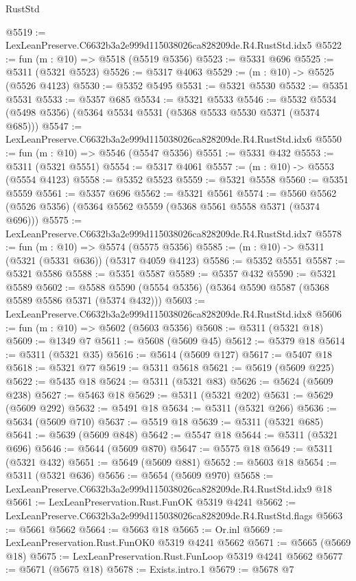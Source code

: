 \begin{lexlean}{RustStd}
\begin{coremodule}
@5519 := LexLeanPreserve.C6632b3a2e999d115038026ca828209de.R4.RustStd.idx5
@5522 := fun (m : @10) => @5518 (@5519 @5356)
@5523 := @5331 @696
@5525 := @5311 (@5321 @5523)
@5526 := @5317 @4063
@5529 := (m : @10) -> @5525 (@5526 @4123)
@5530 := @5352 @5495
@5531 := @5321 @5530
@5532 := @5351 @5531
@5533 := @5357 @685
@5534 := @5321 @5533
@5546 := @5532 @5534 (@5498 @5356) (@5364 @5534 @5531 (@5368 @5533 @5530 @5371 (@5374 @685)))
@5547 := LexLeanPreserve.C6632b3a2e999d115038026ca828209de.R4.RustStd.idx6
@5550 := fun (m : @10) => @5546 (@5547 @5356)
@5551 := @5331 @432
@5553 := @5311 (@5321 @5551)
@5554 := @5317 @4061
@5557 := (m : @10) -> @5553 (@5554 @4123)
@5558 := @5352 @5523
@5559 := @5321 @5558
@5560 := @5351 @5559
@5561 := @5357 @696
@5562 := @5321 @5561
@5574 := @5560 @5562 (@5526 @5356) (@5364 @5562 @5559 (@5368 @5561 @5558 @5371 (@5374 @696)))
@5575 := LexLeanPreserve.C6632b3a2e999d115038026ca828209de.R4.RustStd.idx7
@5578 := fun (m : @10) => @5574 (@5575 @5356)
@5585 := (m : @10) -> @5311 (@5321 (@5331 @636)) (@5317 @4059 @4123)
@5586 := @5352 @5551
@5587 := @5321 @5586
@5588 := @5351 @5587
@5589 := @5357 @432
@5590 := @5321 @5589
@5602 := @5588 @5590 (@5554 @5356) (@5364 @5590 @5587 (@5368 @5589 @5586 @5371 (@5374 @432)))
@5603 := LexLeanPreserve.C6632b3a2e999d115038026ca828209de.R4.RustStd.idx8
@5606 := fun (m : @10) => @5602 (@5603 @5356)
@5608 := @5311 (@5321 @18)
@5609 := @1349 @7
@5611 := @5608 (@5609 @45)
@5612 := @5379 @18
@5614 := @5311 (@5321 @35)
@5616 := @5614 (@5609 @127)
@5617 := @5407 @18
@5618 := @5321 @77
@5619 := @5311 @5618
@5621 := @5619 (@5609 @225)
@5622 := @5435 @18
@5624 := @5311 (@5321 @83)
@5626 := @5624 (@5609 @238)
@5627 := @5463 @18
@5629 := @5311 (@5321 @202)
@5631 := @5629 (@5609 @292)
@5632 := @5491 @18
@5634 := @5311 (@5321 @266)
@5636 := @5634 (@5609 @710)
@5637 := @5519 @18
@5639 := @5311 (@5321 @685)
@5641 := @5639 (@5609 @848)
@5642 := @5547 @18
@5644 := @5311 (@5321 @696)
@5646 := @5644 (@5609 @870)
@5647 := @5575 @18
@5649 := @5311 (@5321 @432)
@5651 := @5649 (@5609 @881)
@5652 := @5603 @18
@5654 := @5311 (@5321 @636)
@5656 := @5654 (@5609 @970)
@5658 := LexLeanPreserve.C6632b3a2e999d115038026ca828209de.R4.RustStd.idx9 @18
@5661 := LexLeanPreservation.Rust.FunOK @5319 @4241
@5662 := LexLeanPreserve.C6632b3a2e999d115038026ca828209de.R4.RustStd.flags
@5663 := @5661 @5662
@5664 := @5663 @18
@5665 := Or.inl
@5669 := LexLeanPreservation.Rust.FunOK0 @5319 @4241 @5662
@5671 := @5665 (@5669 @18)
@5675 := LexLeanPreservation.Rust.FunLoop @5319 @4241 @5662
@5677 := @5671 (@5675 @18)
@5678 := Exists.intro.{1}
@5679 := @5678 @7

\end{coremodule}
\end{lexlean}

